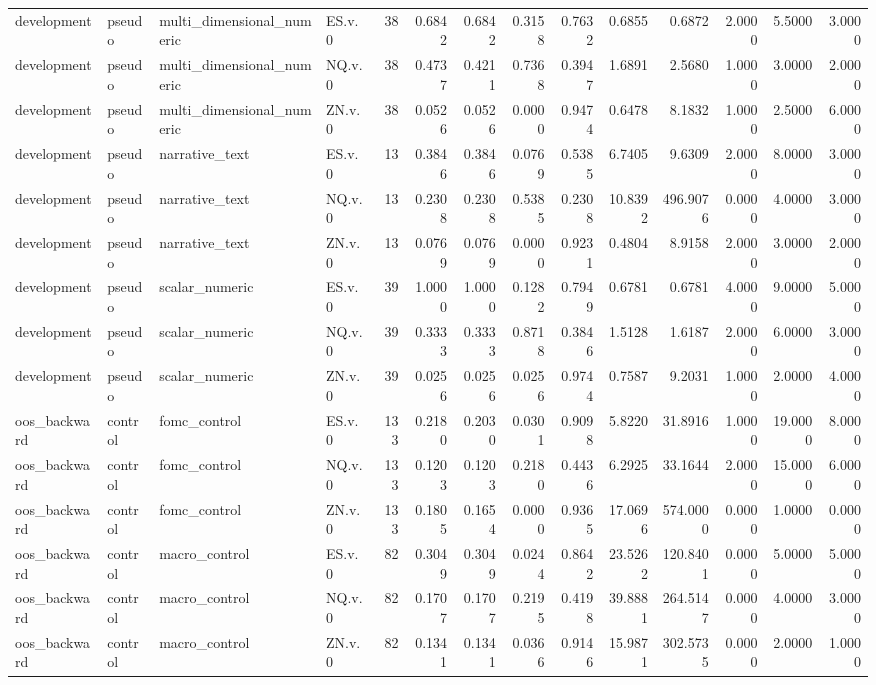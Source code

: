 \begin{tabular}{llllrrrrrrrrrr}
development & pseudo & multi_dimensional_numeric & ES.v.0 & 38 & 0.6842 & 0.6842 & 0.3158 & 0.7632 & 0.6855 & 0.6872 & 2.0000 & 5.5000 & 3.0000 \\
development & pseudo & multi_dimensional_numeric & NQ.v.0 & 38 & 0.4737 & 0.4211 & 0.7368 & 0.3947 & 1.6891 & 2.5680 & 1.0000 & 3.0000 & 2.0000 \\
development & pseudo & multi_dimensional_numeric & ZN.v.0 & 38 & 0.0526 & 0.0526 & 0.0000 & 0.9474 & 0.6478 & 8.1832 & 1.0000 & 2.5000 & 6.0000 \\
development & pseudo & narrative_text & ES.v.0 & 13 & 0.3846 & 0.3846 & 0.0769 & 0.5385 & 6.7405 & 9.6309 & 2.0000 & 8.0000 & 3.0000 \\
development & pseudo & narrative_text & NQ.v.0 & 13 & 0.2308 & 0.2308 & 0.5385 & 0.2308 & 10.8392 & 496.9076 & 0.0000 & 4.0000 & 3.0000 \\
development & pseudo & narrative_text & ZN.v.0 & 13 & 0.0769 & 0.0769 & 0.0000 & 0.9231 & 0.4804 & 8.9158 & 2.0000 & 3.0000 & 2.0000 \\
development & pseudo & scalar_numeric & ES.v.0 & 39 & 1.0000 & 1.0000 & 0.1282 & 0.7949 & 0.6781 & 0.6781 & 4.0000 & 9.0000 & 5.0000 \\
development & pseudo & scalar_numeric & NQ.v.0 & 39 & 0.3333 & 0.3333 & 0.8718 & 0.3846 & 1.5128 & 1.6187 & 2.0000 & 6.0000 & 3.0000 \\
development & pseudo & scalar_numeric & ZN.v.0 & 39 & 0.0256 & 0.0256 & 0.0256 & 0.9744 & 0.7587 & 9.2031 & 1.0000 & 2.0000 & 4.0000 \\
oos_backward & control & fomc_control & ES.v.0 & 133 & 0.2180 & 0.2030 & 0.0301 & 0.9098 & 5.8220 & 31.8916 & 1.0000 & 19.0000 & 8.0000 \\
oos_backward & control & fomc_control & NQ.v.0 & 133 & 0.1203 & 0.1203 & 0.2180 & 0.4436 & 6.2925 & 33.1644 & 2.0000 & 15.0000 & 6.0000 \\
oos_backward & control & fomc_control & ZN.v.0 & 133 & 0.1805 & 0.1654 & 0.0000 & 0.9365 & 17.0696 & 574.0000 & 0.0000 & 1.0000 & 0.0000 \\
oos_backward & control & macro_control & ES.v.0 & 82 & 0.3049 & 0.3049 & 0.0244 & 0.8642 & 23.5262 & 120.8401 & 0.0000 & 5.0000 & 5.0000 \\
oos_backward & control & macro_control & NQ.v.0 & 82 & 0.1707 & 0.1707 & 0.2195 & 0.4198 & 39.8881 & 264.5147 & 0.0000 & 4.0000 & 3.0000 \\
oos_backward & control & macro_control & ZN.v.0 & 82 & 0.1341 & 0.1341 & 0.0366 & 0.9146 & 15.9871 & 302.5735 & 0.0000 & 2.0000 & 1.0000 \\

\end{tabular}
